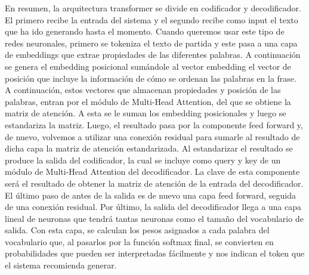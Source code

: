 En resumen, la arquitectura transformer se divide en codificador y decodificador. El primero recibe la entrada del sistema y el segundo recibe como input el texto que ha ido generando hasta el momento. Cuando queremos usar este tipo de redes neuronales, primero se tokeniza el texto de partida y este pasa a una capa de embeddings que extrae propiedades de las diferentes palabras. A continuación se genera el embedding posicional sumándole al vector embedding el vector de posición que incluye la información de cómo se ordenan las palabras en la frase. A continuación, estos vectores que almacenan propiedades y posición de las palabras, entran por el módulo de Multi-Head Attention, del que se obtiene la matriz de atención. A esta se le suman los embedding posicionales y luego se estandariza la matriz. Luego, el resultado pasa por la componente feed forward y, de nuevo, volvemos a utilizar una conexión residual para sumarle al resultado de dicha capa la matriz de atención estandarizada. Al estandarizar el resultado se produce la salida del codificador, la cual se incluye como query y key de un módulo de Multi-Head Attention del decodificador. La clave de esta componente será el resultado de obtener la matriz de atención de la entrada del decodificador. El último paso de antes de la salida es de nuevo una capa feed forward, seguida de una conexión residual. Por último, la salida del decodificador llega a una capa lineal de neuronas que tendrá tantas neuronas como el tamaño del vocabulario de salida. Con esta capa, se calculan los pesos asignados a cada palabra del vocabulario que, al pasarlos por la función softmax final, se convierten en probabilidades que pueden ser interpretadas fácilmente y nos indican el token que el sistema recomienda generar.